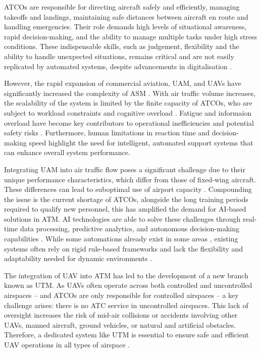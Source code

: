 \Glspl{ATCO} are responsible for directing aircraft safely and efficiently, managing takeoffs and landings, maintaining safe distances between aircraft en route and handling emergencies. 
Their role demands high levels of situational awareness, rapid decision-making, and the ability to manage multiple tasks under high stress conditions.
These indispensable skills, such as judgement, flexibility and the ability to handle unexpected situations, remains critical and are not easily replicated by automated systems, despite advancements in digitalisation \cite{eurocontrol2024digitalisation}.

However, the rapid expansion of commercial aviation, \gls{UAM}, and \glspl{UAV} have significantly increased the complexity of \gls{ASM} \cite{Ramachandran_2025}.
With air traffic volume increases, the scalability of the system is limited by the finite capacity of \glspl{ATCO}, who are subject to workload constraints and cognitive overload \cite{Meier_2024}.
Fatigue and informaion overload  have become key contributors to operational inefficiencies and potential safety risks \cite{Ramachandran_2025}. 
Furthermore, human limitations in reaction time and decision-making speed highlight the need for intelligent, automated support systems that can enhance overall system performance.

Integrating \gls{UAM} into air traffic flow poses a significant challenge due to their unique performance characteristics, which differ from those of fixed-wing aircraft.
These differences can lead to suboptimal use of airport capacity \cite{Schuchardt_2023}.
Compounding the issue is the current shortage of \glspl{ATCO}, alongside the long training periods required to qualify new personnel, this has amplified the demand for \gls{AI}-based solutions in \gls{ATM}. 
\gls{AI} technologies are able to solve these challenges through real-time data processing, predictive analytics, and autonomous decision-making capabilities \cite{Ramachandran_2025}. 
While some automations already exist in some areas \cite{skybrary2025automation}, existing systems often rely on rigid rule-based frameworks and lack the flexibility and adaptability needed for dynamic environments \cite{Meier_2024}. 

The integration of \gls{UAV} into \gls{ATM} has led to the development of a new branch known as \gls{UTM}.
As \glspl{UAV} often operate across both controlled and uncontrolled airspaces -- and \glspl{ATCO} are only responsible for controlled airspaces -- a key challenge arises: there is no \gls{ATC} service in uncontrolled airspaces.
This lack of oversight increases the risk of mid-air collisions or accidents involving other \glspl{UAV}, manned aircraft, ground vehicles, or natural and artificial obstacles.
Therefore, a dedicated system like \gls{UTM} is essential to ensure safe and efficient \gls{UAV} operations in all types of airspace \cite{Zsolt_2017}.

